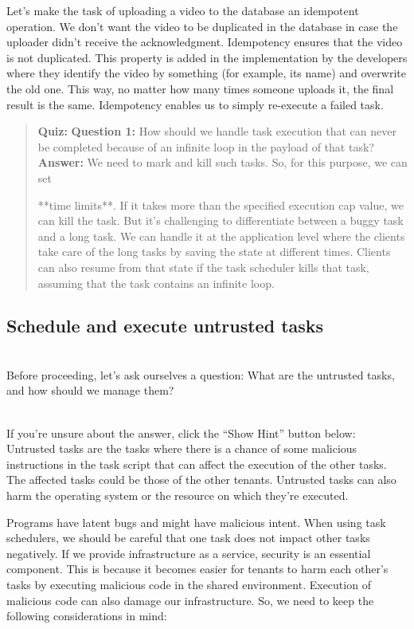 Let's make the task of uploading a video to the database an idempotent operation. We don't want the video to be duplicated in the database in case the uploader didn't receive the acknowledgment. Idempotency ensures that the video is not duplicated. This property is added in the implementation by the developers where they identify the video by something (for example, its name) and overwrite the old one. This way, no matter how many times someone uploads it, the final result is the same. Idempotency enables us to simply re-execute a failed task.

\begin{quote}
\textbf{Quiz:}
\textbf{Question 1:} How should we handle task execution that can never be completed because of an infinite loop in the payload of that task?
\textbf{Answer:} We need to mark and kill such tasks. So, for this purpose, we can set

**time limits**. If it takes more than the specified execution cap value, we can kill the task. But it's challenging to differentiate between a buggy task and a long task. We can handle it at the application level where the clients take care of the long tasks by saving the state at different times. Clients can also resume from that state if the task scheduler kills that task, assuming that the task contains an infinite loop.
\end{quote}

\subsection{Schedule and execute untrusted tasks}\label{TEJbRpMikPNHzHo3K6UV7}
\\
\hfill\break
Before proceeding, let's ask ourselves a question: What are the untrusted tasks, and how should we manage them?\\
\strut \\
If you're unsure about the answer, click the ``Show Hint'' button below:\\

Untrusted tasks are the tasks where there is a chance of some malicious instructions in the task script that can affect the execution of the other tasks. The affected tasks could be those of the other tenants. Untrusted tasks can also harm the operating system or the resource on which they're executed.

Programs have latent bugs and might have malicious intent. When using task schedulers, we should be careful that one task does not impact other tasks negatively. If we provide infrastructure as a service, security is an essential component. This is because it becomes easier for tenants to harm each other's tasks by executing malicious code in the shared environment. Execution of malicious code can also damage our infrastructure. So, we need to keep the following considerations in mind:

